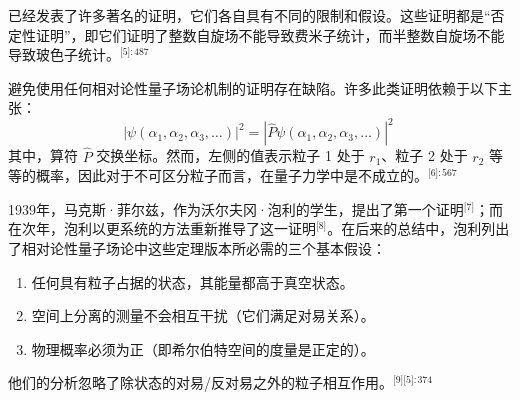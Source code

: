 已经发表了许多著名的证明，它们各自具有不同的限制和假设。这些证明都是“否定性证明”，即它们证明了整数自旋场不能导致费米子统计，而半整数自旋场不能导致玻色子统计。\(^\text{[5]: 487 }\)

避免使用任何相对论性量子场论机制的证明存在缺陷。许多此类证明依赖于以下主张：  
\[
|\psi (\alpha _{1},\alpha _{2},\alpha _{3},\dots )|^{2} = |{\hat {P}}\psi (\alpha _{1},\alpha _{2},\alpha _{3},\dots )|^{2}~
\]
其中，算符 \( \hat{P} \) 交换坐标。然而，左侧的值表示粒子 1 处于 \( r_1 \)、粒子 2 处于 \( r_2 \) 等等的概率，因此对于不可区分粒子而言，在量子力学中是不成立的。\(^\text{[6]: 567  }\)

1939年，马克斯·菲尔兹，作为沃尔夫冈·泡利的学生，提出了第一个证明\(^\text{[7]}\)；而在次年，泡利以更系统的方法重新推导了这一证明\(^\text{[8]}\)。在后来的总结中，泡利列出了相对论性量子场论中这些定理版本所必需的三个基本假设：
\begin{enumerate}
\item 任何具有粒子占据的状态，其能量都高于真空状态。
\item 空间上分离的测量不会相互干扰（它们满足对易关系）。
\item 物理概率必须为正（即希尔伯特空间的度量是正定的）。
\end{enumerate}
他们的分析忽略了除状态的对易/反对易之外的粒子相互作用。\(^\text{[9][5]: 374 }\)

